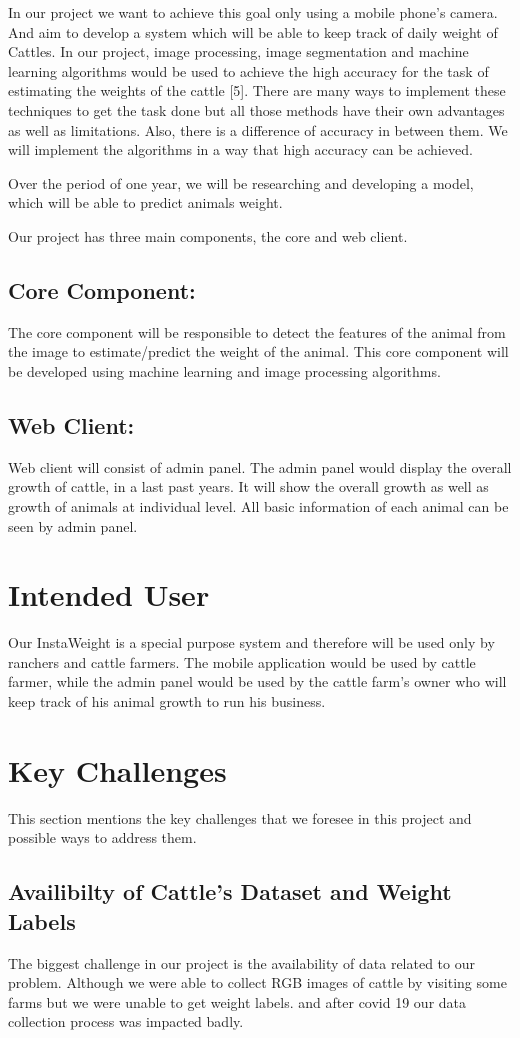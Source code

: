 In our project we want to achieve this goal only using a mobile phone’s camera. And aim to develop a system which will be able to keep track of daily weight of Cattles.  
In our project, image processing, image segmentation and machine learning algorithms would be used to achieve the high accuracy for the task of estimating the weights of the cattle [5].  There are many ways to implement these techniques to get the task done but all those methods have their own advantages as well as limitations. Also, there is a difference of accuracy in between them. We will implement the algorithms in a way that high accuracy can be achieved.  

Over the period of one year, we will be researching and developing a model, which will be able to predict animals weight. 

Our project has three main components, the core and web client.
\subsection{{Core Component:}}
The core component will be responsible to detect the features of the animal from the image to estimate/predict the weight of the animal. This core component will be developed using machine learning and image processing algorithms. 
\subsection{Web Client:}
Web client will consist of admin panel. The admin panel would display the overall growth of cattle, in a last past years. It will show the overall growth as well as growth of animals at individual level. All basic information of each animal can be seen by admin panel. 


\section{Intended User}

Our InstaWeight is a special purpose system and therefore will be used only by ranchers and cattle farmers. The mobile application would be used by cattle farmer, while the admin panel would be used by the cattle farm's owner who will keep track of his animal growth to run his business. 

\section{Key Challenges}
This section mentions the key challenges that we foresee in this project and possible ways to address them.

\subsection{Availibilty of Cattle's Dataset and Weight Labels}
The biggest challenge in our project is the availability of data related to our problem. Although we were able to collect RGB images of cattle by visiting some farms but we were unable to get weight labels. and after covid 19 our data collection process was impacted badly.




